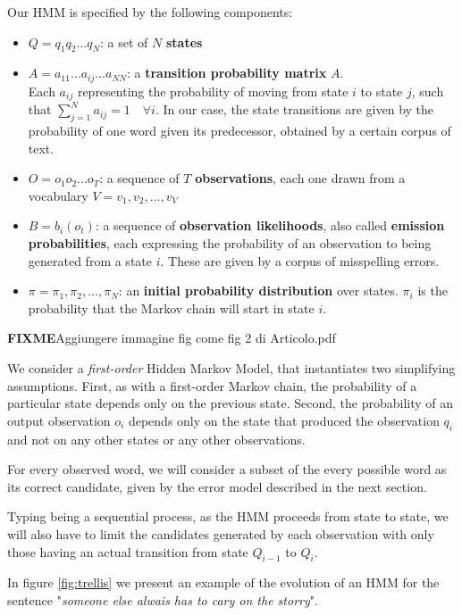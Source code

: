 Our HMM is specified by the following components:
\begin{itemize}
	\item $Q = q_1q_2 \dots q_N$: a set of $N$ \textbf{states}
	\item $A=a_{11}	\dots a_{ij} \dots a_{NN}$: a \textbf{transition probability matrix} $A$. \\ Each $a_{ij}$ 
	representing the probability of moving from state $i$ to state $j$, such that $\sum_{j=1}^N a_{ij}=1 \quad 
	\forall i$. In our case, the state transitions are given by the probability of one word given its predecessor, 
	obtained by a certain corpus of text.
	\item $O = o_1o_2 \dots o_T$: a sequence of $T$ \textbf{observations}, each one drawn from a vocabulary 
	$V = v_1,v_2,\dots,v_V$
	\item $B = b_i (o_t )$: a sequence of \textbf{observation likelihoods}, also called \textbf{emission 
		probabilities}, each expressing the probability of an observation to being generated from a state $i$. These 
	are given by a corpus of misspelling errors.
	\item $\pi = \pi_1,\pi_2,\dots,\pi_N$: an \textbf{initial probability distribution} over states. $\pi_i$ is the 
	probability that the Markov chain will start in state $i$. 
\end{itemize}

\textbf{FIXME}{Aggiungere immagine fig come fig 2 di Articolo.pdf }

We consider a \textit{first-order} Hidden Markov Model, that instantiates two simplifying assumptions. First, as 
with a first-order Markov chain, the probability of a particular state depends only on the previous state. Second, 
the probability of an output observation $o_i$ depends only on the state that produced the observation $q_i$ 
and not on any other states or any other observations.

For every observed word, we will consider a subset of the every possible word as its correct candidate, given by 
the error model described in the next section.

Typing being a sequential process, as the HMM proceeds from state to state, we will also have to limit the 
candidates generated by each observation with only those having an actual transition from state $Q_{i-1}$ to 
$Q_i$.

In figure \ref{fig:trellis} we present an example of the evolution of an HMM for the sentence "\textsl{someone 
	else alwais has to cary on the storry}".

